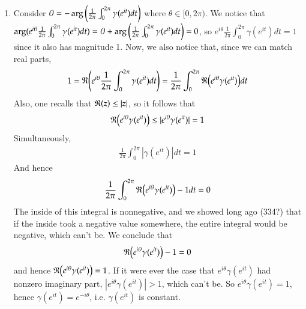 \documentclass[12pt]{article}
\theoremstyle{definitionstyle}
\renewcommand{\Re}{\mathfrak{R}\qty}
\begin{document}
\begin{enumerate}[leftmargin=\labelsep]
		\item Consider $\theta = -\arg\qty(\frac{1}{2\pi} \int_0^{2\pi} \gamma(e^{it})dt)$ where $\theta \in [0, 2\pi)$. We notice that $\arg(e^{i\theta} \frac{1}{2\pi} \int_0^{2\pi} \gamma(e^{it})dt) = \theta + \arg\qty(\frac{1}{2\pi} \int_0^{2\pi} \gamma(e^{it})dt) = 0$, so $e^{i\theta} \frac{1}{2\pi} \int_0^{2\pi} \gamma(e^{it})dt = 1$ since it also has magnitude 1. Now, we also notice that, since we can match real parts,
		\begin{align*}
			1 = \Re(e^{i\theta} \frac{1}{2\pi} \int_0^{2\pi} \gamma(e^{it})dt) = \frac{1}{2\pi} \int_0^{2\pi} \Re(e^{i\theta} \gamma(e^{it}))dt
		\end{align*}
		Also, one recalls that $\Re(z) \leq |z|$, so it follows that 
		\begin{align*}
			\Re(e^{i\theta} \gamma(e^{it})) \leq |e^{i\theta} \gamma(e^{it})| = 1
		\end{align*}
		Simultaneously,
		\begin{align*}
			\frac{1}{2\pi} \int_0^{2\pi} |\gamma(e^{it})|dt = 1
		\end{align*}
		And hence 
		\begin{align*}
			\frac{1}{2\pi} \int_0^{2\pi} \Re(e^{i\theta} \gamma(e^{it})) - 1dt = 0
		\end{align*}
		The inside of this integral is nonnegative, and we showed long ago (334?) that if the inside took a negative value somewhere, the entire integral would be negative, which can't be. We conclude that
		\begin{align*}
			\Re(e^{i\theta} \gamma(e^{it})) - 1 = 0
		\end{align*}
		and hence $\Re(e^{i\theta}\gamma(e^{it})) = 1$. If it were ever the case that $e^{i\theta}\gamma(e^{it})$ had nonzero imaginary part, $|e^{i\theta}\gamma(e^{it})| > 1$, which can't be. So $e^{i\theta}\gamma(e^{it}) = 1$, hence $\gamma(e^{it}) = e^{-i\theta}$, i.e. $\gamma(e^{it})$ is constant.
	\end{enumerate}
\end{document}
